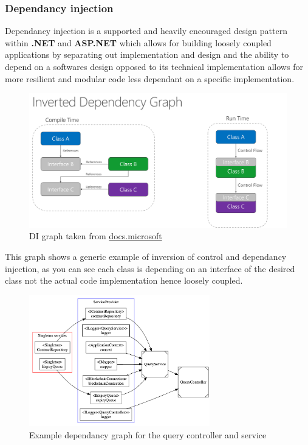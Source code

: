 \documentclass[12pt]{article}
\begin{document}
\subsubsection{Dependancy injection}

Dependancy injection is a supported and heavily encouraged design pattern within \textbf{.NET} and \textbf{ASP.NET} which allows for building loosely coupled applications by separating out implementation and design and the ability to depend on a softwares design opposed to its technical implementation allows for more resilient and modular code less dependant on a specific implementation.

\begin{figure}[H]
\caption{DI graph taken from \href{https://docs.microsoft.com/en-us/dotnet/architecture/modern-web-apps-azure/architectural-principles#dependency-inversion}{docs.microsoft}}
\centering
\includegraphics[width=\textwidth,height=\textheight,keepaspectratio]{images/patterns/ms-di}
\centering
\end{figure}

This graph shows a generic example of inversion of control and dependancy injection, as you can see each class is depending on an interface of the desired class not the actual code implementation hence loosely coupled.

\begin{figure}[H]
\caption{Example dependancy graph for the query controller and service}
\centering
\includegraphics[width=0.7\textwidth,height=0.7\textheight,keepaspectratio]{images/patterns/DI-example}
\end{figure}
\end{document}

